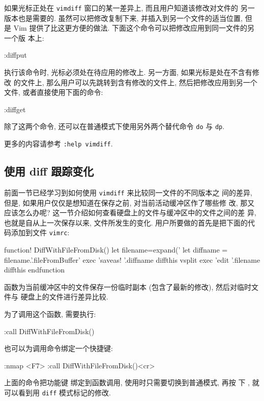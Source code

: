 如果光标正处在 \texttt{vimdiff} 窗口的某一差异上, 而且用户知道该修改对文件的
另一版本也是需要的. 虽然可以把修改复制下来, 并插入到另一个文件的适当位置, 但
是 Vim 提供了比这更方便的做法. 下面这个命令可以把修改应用到同一文件的另一个版
本上:
\begin{vimcode}
:diffput
\end{vimcode}

执行该命令时, 光标必须处在待应用的修改上. 另一方面, 如果光标是处在不含有修改
的文件上, 那么用户可以先跳转到含有修改的文件上, 然后把修改应用到另一个文件,
或者直接使用下面的命令:
\begin{vimcode}
:diffget
\end{vimcode}
除了这两个命令, 还可以在普通模式下使用另外两个替代命令 \texttt{do} 与
\texttt{dp}.

\begin{warning}
    更多的内容请参考 \texttt{:help vimdiff}.
\end{warning}

\subsection{使用 diff 跟踪变化}
\label{subsec:using_diff_to_track_changes}

前面一节已经学习到如何使用 \texttt{vimdiff} 来比较同一文件的不同版本之
间的差异, 但是, 如果用户仅仅是想知道在保存之前, 对当前活动缓冲区作了哪些修
改, 那又应该怎么办呢? 这一节介绍如何查看硬盘上的文件与缓冲区中的文件之间的差
异, 也就是自从上一次保存以来, 文件所发生的变化.
用户所要做的首先是把下面的代码添加到文件 \texttt{vimrc}:
\begin{vimcode}
function! DiffWithFileFromDisk()
	  let filename=expand('%
	  let diffname = filename.'.fileFromBuffer'
	  exec 'saveas! '.diffname
	  diffthis
	  vsplit
	  exec 'edit '.filename
	  diffthis
	endfunction
\end{vimcode}

函数为当前缓冲区中的文件保存一份临时副本 (包含了最新的修改), 然后对临时文件与
硬盘上的文件进行差异比较.

为了调用这个函数, 需要执行:
\begin{vimcode}
:call DiffWithFileFromDisk()
\end{vimcode}
也可以为调用命令绑定一个快捷键:
\begin{vimcode}
:nmap <F7> :call DiffWithFileFromDisk()<cr>
\end{vimcode}
上面的命令把功能键  绑定到函数调用, 使用时只需要切换到普通模式, 再按
下 , 就可以看到用 \texttt{diff} 模式标记的修改.

